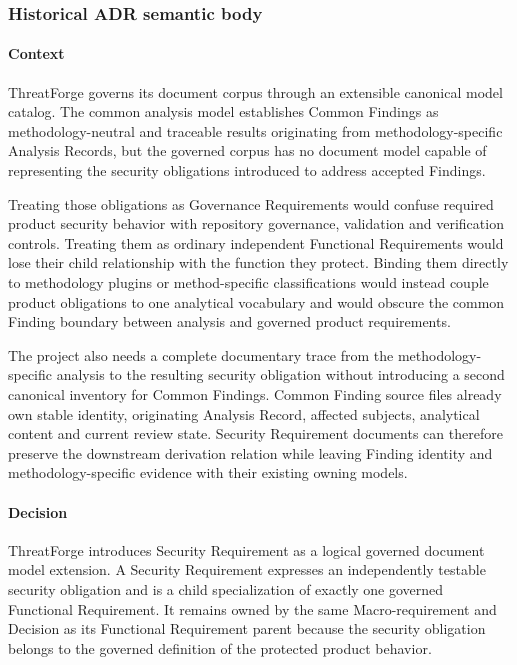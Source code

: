 \documentclass[
  10pt,
]{article}
\begin{document}
\subsubsection{Historical ADR semantic
body}\label{historical-adr-semantic-body-7}

\paragraph{Context}\label{context-14}

ThreatForge governs its document corpus through an extensible canonical
model catalog. The common analysis model establishes Common Findings as
methodology-neutral and traceable results originating from
methodology-specific Analysis Records, but the governed corpus has no
document model capable of representing the security obligations
introduced to address accepted Findings.

Treating those obligations as Governance Requirements would confuse
required product security behavior with repository governance,
validation and verification controls. Treating them as ordinary
independent Functional Requirements would lose their child relationship
with the function they protect. Binding them directly to methodology
plugins or method-specific classifications would instead couple product
obligations to one analytical vocabulary and would obscure the common
Finding boundary between analysis and governed product requirements.

The project also needs a complete documentary trace from the
methodology-specific analysis to the resulting security obligation
without introducing a second canonical inventory for Common Findings.
Common Finding source files already own stable identity, originating
Analysis Record, affected subjects, analytical content and current
review state. Security Requirement documents can therefore preserve the
downstream derivation relation while leaving Finding identity and
methodology-specific evidence with their existing owning models.

\paragraph{Decision}\label{decision-14}

ThreatForge introduces Security Requirement as a logical governed
document model extension. A Security Requirement expresses an
independently testable security obligation and is a child specialization
of exactly one governed Functional Requirement. It remains owned by the
same Macro-requirement and Decision as its Functional Requirement parent
because the security obligation belongs to the governed definition of
the protected product behavior.
\end{document}
